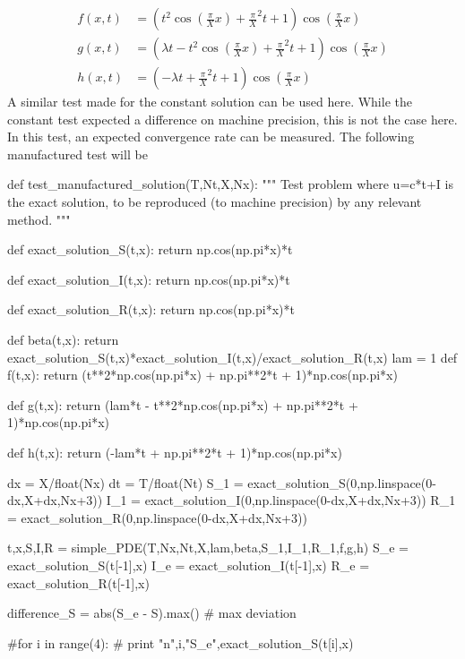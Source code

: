 \documentclass[%
twoside,                 %
final,                   %
chapterprefix=true,      %
open=right               %
10pt]{book}
\begin{document}
\begin{equation} \label{eq:manu_func}
	\begin{aligned}
	f(x,t) &= (t^2\cos(\frac{\pi}{X} x) + \frac{\pi}{X}^2t + 1)\cos(\frac{\pi}{X} x)\\
	g(x,t) &= (\lambda t - t^2\cos(\frac{\pi}{X} x) + \frac{\pi}{X}^2t + 1)\cos(\frac{\pi}{X} x)\\
	h(x,t) &= (-\lambda t + \frac{\pi}{X}^2t + 1)\cos(\frac{\pi}{X} x)
	\end{aligned}
\end{equation}
A similar test made for the constant solution can be used here. While the constant test expected a difference on machine precision, this is not the case here. In this test, an expected convergence rate can be measured. The following manufactured test will be

\bpycod
def test_manufactured_solution(T,Nt,X,Nx):
    """
    Test problem where u=c*t+I is the exact solution, to be
    reproduced (to machine precision) by any relevant method.
    """
    
    def exact_solution_S(t,x):
        return np.cos(np.pi*x)*t

    def exact_solution_I(t,x):
        return np.cos(np.pi*x)*t

    def exact_solution_R(t,x):
        return np.cos(np.pi*x)*t


    def beta(t,x):
        return exact_solution_S(t,x)*exact_solution_I(t,x)/exact_solution_R(t,x)
    lam = 1
    def f(t,x):
        return (t**2*np.cos(np.pi*x) + np.pi**2*t + 1)*np.cos(np.pi*x) 

    def g(t,x):
        return (lam*t - t**2*np.cos(np.pi*x) + np.pi**2*t + 1)*np.cos(np.pi*x)

    def h(t,x):
        return (-lam*t + np.pi**2*t + 1)*np.cos(np.pi*x)
        

    dx = X/float(Nx)
    dt = T/float(Nt)
    S_1 = exact_solution_S(0,np.linspace(0-dx,X+dx,Nx+3))
    I_1 = exact_solution_I(0,np.linspace(0-dx,X+dx,Nx+3))
    R_1 = exact_solution_R(0,np.linspace(0-dx,X+dx,Nx+3))
     
    t,x,S,I,R = simple_PDE(T,Nx,Nt,X,lam,beta,S_1,I_1,R_1,f,g,h)
    S_e = exact_solution_S(t[-1],x)
    I_e = exact_solution_I(t[-1],x)
    R_e = exact_solution_R(t[-1],x)
    
    difference_S = abs(S_e - S).max()  # max deviation

    
    #for i in range(4):
    #    print "n",i,"S_e",exact_solution_S(t[i],x)
    
\end{document}
